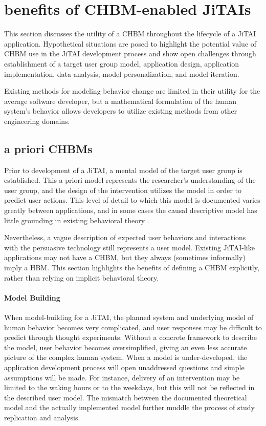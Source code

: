 \documentclass[runningheads,a4paper]{llncs}
\begin{document}
\section{benefits of CHBM-enabled JiTAIs}
This section discusses the utility of a CHBM throughout the lifecycle of a JiTAI application.
Hypothetical situations are posed to highlight the potential value of CHBM use in the JiTAI development process and show open challenges through establishment of a target user group model, application design, application implementation, data analysis, model personalization, and model iteration.

Existing methods for modeling behavior change are limited in their utility for the average software developer, but a mathematical formulation of the human system’s behavior allows developers to utilize existing methods from other engineering domains.

\subsection{a priori CHBMs}
Prior to development of a JiTAI, a mental model of the target user group is established.
This a priori model represents the researcher’s understanding of the user group, and the design of the intervention utilizes the model in order to predict user actions.
This level of detail to which this model is documented varies greatly between applications, and in some cases the causal descriptive model has little grounding in existing behavioral theory \cite{prestwich2014does}.


Nevertheless, a vague description of expected user behaviors and interactions with the persuasive technology still represents a user model.
Existing JiTAI-like applications may not have a CHBM, but they always (sometimes informally) imply a HBM.
This section highlights the benefits of defining a CHBM explicitly, rather than relying on implicit behavioral theory.
\paragraph{Model Building}
When model-building for a JiTAI, the planned system and underlying model of human behavior becomes very complicated, and user responses may be difficult to predict through thought experiments.
Without a concrete framework to describe the model, user behavior becomes oversimplified, giving an even less accurate picture of the complex human system.
When a model is under-developed, the application development process will open unaddressed questions and simple assumptions will be made.
For instance, delivery of an intervention may be limited to the waking hours or to the weekdays, but this will not be reflected in the described user model.
The mismatch between the documented theoretical model and the actually implemented model further muddle the process of study replication and analysis.
\end{document}
